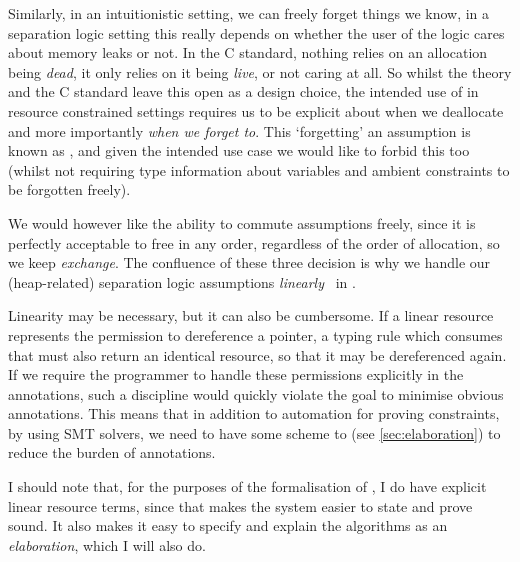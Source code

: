 Similarly, in an intuitionistic setting, we can freely forget things we know,
in a separation logic setting this really depends on whether the user of the logic
cares about memory leaks or not. In the C standard, nothing relies on an
allocation being \emph{dead}, it only relies on it being \emph{live}, or not
caring at all. So whilst the theory and the C standard leave this open as a
design choice, the intended use of  in resource constrained settings
requires us to be explicit about when we deallocate and more importantly
\emph{when we forget to}. This `forgetting'
an assumption is known as , and given the intended use case we
would like to forbid this too (whilst not requiring type information about
variables and ambient constraints to be forgotten freely).

We would however like the ability to commute assumptions freely, since it is
perfectly acceptable to free in any order, regardless of the order of
allocation, so we keep \emph{exchange}. The confluence of these three decision
is why we handle our (heap-related) separation logic assumptions
\emph{linearly}~ in .

Linearity may be necessary, but it can also be cumbersome. If a linear resource
represents the permission to dereference a pointer, a typing rule which
consumes that must also return an identical resource, so that it may be
dereferenced again. If we require the programmer to handle these permissions
explicitly in the annotations, such a discipline would quickly violate the goal
to minimise obvious annotations. This means that in addition to automation for
proving constraints, by using SMT solvers, we need to have some scheme to
 (see \cref{sec:elaboration}) to
reduce the burden of annotations.

I should note that, for the purposes of the formalisation of , I
do have explicit linear resource terms, since that makes the system easier to
state and prove sound. It also makes it easy to specify and explain the 
 algorithms as an \emph{elaboration}, which I will also
do.

